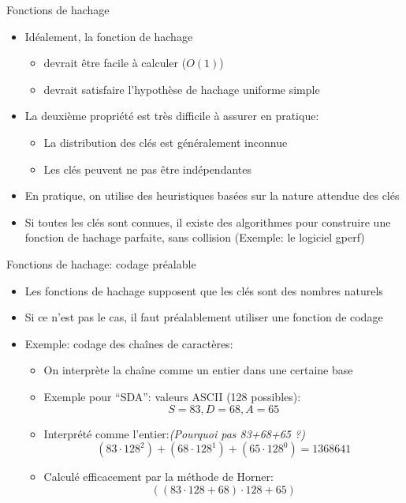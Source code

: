 \begin{frame}{Fonctions de hachage}
\begin{itemize}
\item Idéalement, la fonction de hachage
\begin{itemize}
\item devrait être facile à calculer ($O(1)$)
\item devrait satisfaire l'hypothèse de hachage uniforme simple
\end{itemize}
\item La deuxième propriété est très difficile à assurer en pratique:
\begin{itemize}
\item La distribution des clés est généralement inconnue
\item Les clés peuvent ne pas être indépendantes
\end{itemize}
\item En pratique, on utilise des heuristiques basées sur la nature
  attendue des clés
\item Si toutes les clés sont connues, il existe des algorithmes pour
  construire une fonction de hachage parfaite, sans collision
  (Exemple: le logiciel gperf)
\end{itemize}

\end{frame}

\begin{frame}{Fonctions de hachage: codage préalable}

\begin{itemize}
\item Les fonctions de hachage supposent que les clés sont des nombres naturels
\item Si ce n'est pas le cas, il faut préalablement utiliser une \alert{fonction de codage}
\item Exemple: codage des chaînes de caractères:
\begin{itemize}
\item On interprète la chaîne comme un entier dans une certaine base
\item Exemple pour ``SDA'': valeurs ASCII (128 possibles): $$S=83, D=68, A=65$$
\item Interprété comme l'entier:\hfill {\it (Pourquoi pas 83+68+65 ?)}
 $$(83\cdot 128^2)+(68\cdot 128^1)+(65\cdot 128^0)=1368641$$
\item Calculé efficacement par la méthode de Horner:
$$((83\cdot 128+68)\cdot 128 + 65)$$
\end{itemize}
\end{itemize}
\end{frame}

